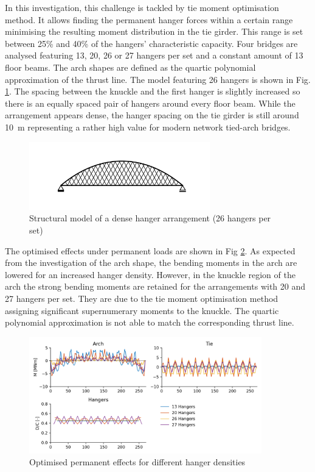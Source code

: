 In this investigation, this challenge is tackled by tie moment optimisation method. It allows finding the permanent hanger forces within a certain range minimising the resulting moment distribution in the tie girder. This range is set between 25\% and 40\% of the hangers' characteristic capacity.  Four bridges are analysed featuring 13, 20, 26 or 27 hangers per set and a constant amount of 13 floor beams. The arch shapes are defined as the quartic polynomial approximation of the thrust line. The model featuring 26 hangers is shown in Fig. \ref{fig:structure_26}. The spacing between the knuckle and the first hanger is slightly increased so there is an equally spaced pair of hangers around every floor beam. While the arrangement appears dense, the hanger spacing on the tie girder is still around \SI{10}{m} representing a rather high value for modern network tied-arch bridges.

\begin{figure}[H]
    \centering
    \includegraphics[trim={0 1cm 0 1cm},clip, width=0.7\textwidth]{calculations/hanger amount comparison/structure_26.png}
    \caption{Structural model of a dense hanger arrangement (26 hangers per set)}
    \label{fig:structure_26}
\end{figure}

The optimised effects under permanent loads are shown in Fig \ref{fig:hd_permanent}. As expected from the investigation of the arch shape, the bending moments in the arch are lowered for an increased hanger density. However, in the knuckle region of the arch the strong bending moments are retained for the arrangements with 20 and 27 hangers per set. They are due to the tie moment optimisation method assigning significant supernumerary moments to the knuckle. The quartic polynomial approximation is not able to match the corresponding thrust line.

\begin{figure}[H]
    \centering
    \includegraphics[width=0.9\textwidth]{calculations/hanger amount comparison/permanent state.png}
    \caption{Optimised permanent effects for different hanger densities}
    \label{fig:hd_permanent}
\end{figure}

